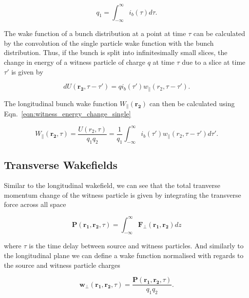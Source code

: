 \begin{equation}
q_{1} = \int^{\infty}_{-\infty}i_{b}\left( \tau \right) d\tau{}.
\end{equation}

The wake function of a bunch distribution at a point at time $\tau$ can be calculated by the convolution of the single particle wake function with the bunch distribution. Thus, if the bunch is split into infinitesimally small slices, the change in energy of a witness particle of charge $q$ at time $\tau$ due to a slice at time $\tau{}'$ is given by

\begin{equation}
dU\left(\mathbf{r_{2}}, \tau-\tau{}'  \right) = q i_{b}\left( \tau{}' \right) w_{\parallel}\left( r_{2}, \tau{}-\tau{}' \right).
\end{equation}

The longitudinal bunch wake function $W_{\parallel}\left(\mathbf{r_{2}}\right)$ can then be calculated using Eqn.~\ref{eqn:witness_energy_change_single}

\begin{equation}
W_{\parallel}\left( \mathbf{r_{2}}, \tau \right) = \frac{U\left( r_{2}, \tau \right) }{q_{1} q_{2}} = \frac{1}{q_{1}}\int^{\infty}_{-\infty}i_{b}\left( \tau{}' \right) w_{\parallel}\left( r_{2}, \tau{}-\tau{}'\right) d\tau{}' .
\end{equation}

\subsection{Transverse Wakefields}

Similar to the longitudinal wakefield, we can see that the total tranverse momentum change of the witness particle is given by integrating the transverse force across all space

\begin{equation}
\mathbf{P}\left(\mathbf{r_{1}}, \mathbf{r_{2}}, \tau  \right) = \int^{\infty}_{-\infty} \mathbf{F_{\perp}} \left( \mathbf{r_{1}},  \mathbf{r_{2}}\right) dz
\end{equation}

where $\tau$ is the time delay between source and witness particles. And similarly to the longitudinal plane we can define a wake function normalised with regards to the source and witness particle charges

\begin{equation}
\mathbf{w_{\perp}}\left(\mathbf{r_{1}}, \mathbf{r_{2}}, \tau  \right) = \frac{\mathbf{P}\left(\mathbf{r_{1}}, \mathbf{r_{2}}, \tau  \right)}{q_{1} q_{2}}.
\label{eqn:trans_wake_func}
\end{equation}

